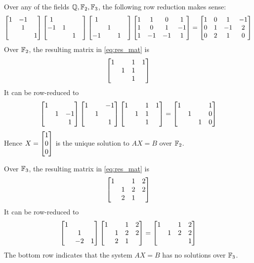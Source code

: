 \documentclass[12pt]{article}
\begin{document}
\subsection{} 
Over any of the fields $\mathbb{Q}, \mathbb{F}_2, \mathbb{F}_3$, the following row reduction makes sense: 
\begin{equation} \label{eq:res_mat}
  \begin{bmatrix}1 & -1 & \\ & 1 & \\ & & 1\end{bmatrix} \begin{bmatrix}1 & & & \\ -1 & 1 &  \\ & & 1\end{bmatrix} \begin{bmatrix}1 & & & \\  & 1 &  \\ -1 & & 1\end{bmatrix} \begin{bmatrix}1 & 1 & 0 & 1 \\ 1 & 0 & 1 & -1 \\ 1 & -1 & -1 & 1\end{bmatrix} = \begin{bmatrix}1 & 0 & 1 & -1 \\ 0 & 1 & -1 & 2 \\ 0 & 2 & 1 & 0\end{bmatrix}  
\end{equation}
Over $\mathbb{F}_{2}$, the resulting matrix in \eqref{eq:res_mat} is 
$$\begin{bmatrix}1 & & 1 & 1 \\ & 1 & 1 & \\ & & 1 \end{bmatrix}$$
It can be row-reduced to 
$$\begin{bmatrix}1 & &  \\  & 1 & -1 \\  &  & 1\end{bmatrix} \begin{bmatrix}1 & & -1\\  & 1 &  \\  &  & 1\end{bmatrix} \begin{bmatrix}1 & & 1 & 1 \\ & 1 & 1 & \\ & & 1 \end{bmatrix} = \begin{bmatrix}1 & & & 1 \\ & 1 & & 0 \\ & & 1 & 0\end{bmatrix}$$
Hence $X = \begin{bmatrix}1 \\ 0 \\ 0\end{bmatrix}$ is the unique solution to $AX = B$ over $\mathbb{F}_{2}$. 

Over $\mathbb{F}_3$, the resulting matrix in \eqref{eq:res_mat} is 
$$\begin{bmatrix}1 & & 1 & 2 \\ & 1 & 2 & 2 \\  & 2 & 1 & \end{bmatrix}$$
It can be row-reduced to 
$$\begin{bmatrix}1 & & \\ & 1 & \\ & -2 & 1\end{bmatrix} \begin{bmatrix}1 & & 1 & 2 \\ & 1 & 2 & 2 \\  & 2 & 1 & \end{bmatrix} = \begin{bmatrix}1 & & 1 & 2 \\ & 1 & 2 & 2 \\ & & & 1\end{bmatrix}$$
The bottom row indicates that the system $AX = B$ has no solutions over $\mathbb{F}_3$. 
\end{document}

